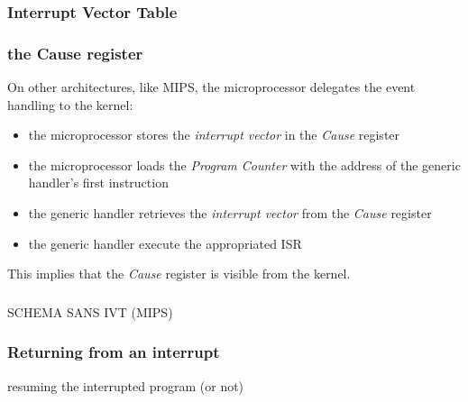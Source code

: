 %
%
%

\begin{frame}
  \frametitle{Interrupt Vector Table}

  \begin{center}
  \end{center}

\end{frame}

%
%
%

\begin{frame}
  \frametitle{the Cause register}

  On other architectures, like MIPS, the microprocessor delegates the event
  handling to the kernel:

  \nl

  \begin{itemize}
    \item the microprocessor stores the {\em interrupt vector} in the
    {\em Cause} register
    \item the microprocessor loads the {\em Program Counter} with the
      address of the generic handler's first instruction
    \item the generic handler retrieves the {\em interrupt vector} from
      the {\em Cause} register
    \item the generic handler execute the appropriated ISR
  \end{itemize}

  \nl

  This implies that the {\em Cause} register is visible from the kernel.
\end{frame}


%
%
%

\begin{frame}
  \frametitle{}

  SCHEMA SANS IVT (MIPS)

\end{frame}

%
%
%

\begin{frame}
  \frametitle{Returning from an interrupt}

  resuming the interrupted program (or not)


\end{frame}

%
%
%

